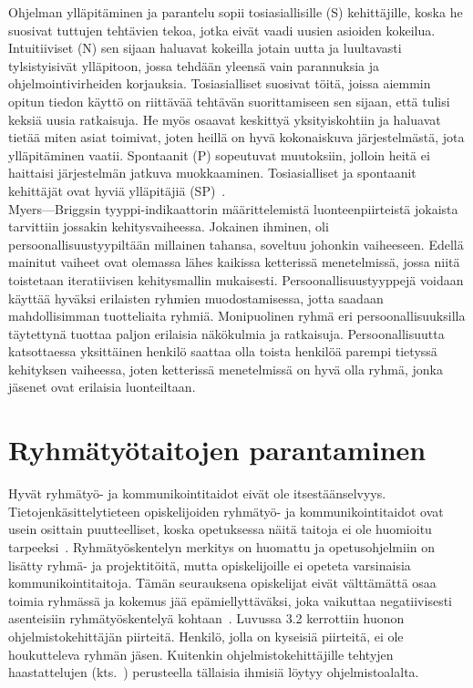 \documentclass[finnish]{../tktltiki2}
\theoremstyle{definition}
\theoremstyle{remark}
\begin{document}
Ohjelman ylläpitäminen ja parantelu sopii tosiasiallisille (S) kehittäjille, koska he suosivat tuttujen tehtävien tekoa, jotka eivät vaadi uusien asioiden kokeilua. Intuitiiviset (N) sen sijaan haluavat kokeilla jotain uutta ja luultavasti tylsistyisivät ylläpitoon, jossa tehdään yleensä vain parannuksia ja ohjelmointivirheiden korjauksia. Tosiasialliset suosivat töitä, joissa aiemmin opitun tiedon käyttö on riittävää tehtävän suorittamiseen sen sijaan, että tulisi keksiä uusia ratkaisuja. He myös osaavat keskittyä yksityiskohtiin ja haluavat tietää miten asiat toimivat, joten heillä on hyvä kokonaiskuva järjestelmästä, jota ylläpitäminen vaatii. Spontaanit (P) sopeutuvat muutoksiin, jolloin heitä ei haittaisi järjestelmän jatkuva muokkaaminen. Tosiasialliset ja spontaanit kehittäjät ovat hyviä ylläpitäjiä (SP)~\cite{Capretz:2010:MSS:1726559.1726574}.\\

Myers---Briggsin tyyppi-indikaattorin määrittelemistä luonteenpiirteistä jokaista tarvittiin jossakin kehitysvaiheessa. Jokainen ihminen, oli persoonallisuustyypiltään millainen tahansa, soveltuu johonkin vaiheeseen. Edellä mainitut vaiheet ovat olemassa lähes kaikissa ketterissä menetelmissä, jossa niitä toistetaan iteratiivisen kehitysmallin mukaisesti. Persoonallisuustyyppejä voidaan käyttää hyväksi erilaisten ryhmien muodostamisessa, jotta saadaan mahdollisimman tuotteliaita ryhmiä. Monipuolinen ryhmä eri persoonallisuuksilla täytettynä tuottaa paljon erilaisia näkökulmia ja ratkaisuja. Persoonallisuutta katsottaessa yksittäinen henkilö saattaa olla toista henkilöä parempi tietyssä kehityksen vaiheessa, joten ketterissä menetelmissä on hyvä olla ryhmä, jonka jäsenet ovat erilaisia luonteiltaan.

\section{Ryhmätyötaitojen parantaminen}

Hyvät ryhmätyö- ja kommunikointitaidot eivät ole itsestäänselvyys. Tietojenkäsittelytieteen opiskelijoiden ryhmätyö- ja kommunikointitaidot ovat usein osittain puutteelliset, koska opetuksessa näitä taitoja ei ole huomioitu tarpeeksi~\cite{Cushing:2003:TBP:948785.948797,Jun:2010,Waite:2004:SCV:1028174.971308}. Ryhmätyöskentelyn merkitys on huomattu ja
opetusohjelmiin on lisätty ryhmä- ja projektitöitä, mutta opiskelijoille ei opeteta varsinaisia kommunikointitaitoja. Tämän seurauksena opiskelijat eivät välttämättä osaa toimia ryhmässä ja kokemus jää epämiellyttäväksi, joka vaikuttaa negatiivisesti asenteisiin ryhmätyöskentelyä kohtaan~\cite{1158709}.
Luvussa 3.2 kerrottiin huonon ohjelmistokehittäjän piirteitä. Henkilö, jolla on kyseisiä piirteitä, ei ole houkutteleva ryhmän jäsen. Kuitenkin ohjelmistokehittäjille tehtyjen haastattelujen (kts.~\cite{Begel:2008:PPW:1414004.1414026,Hall:2007:CNT:1235000.1235043}) perusteella tällaisia ihmisiä löytyy ohjelmistoalalta.\\
\end{document}
